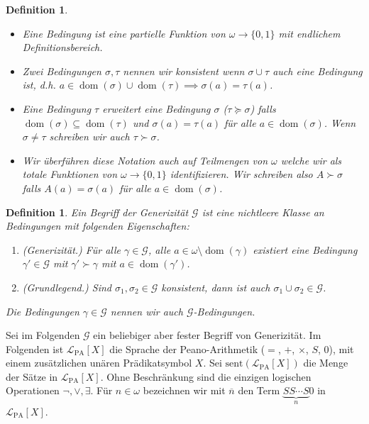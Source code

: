 \documentclass[nofonts]{uebung}
\newtheorem{definition}[theorem]{Definition}
\DeclareMathOperator{\dom}{dom}
\begin{document}
\begin{definition}\begin{itemize}
    \item Eine \emph{Bedingung} ist eine partielle Funktion von $\omega \to \{0,1\}$ mit endlichem Definitionsbereich.
        \item Zwei Bedingungen $\sigma,\tau$ nennen wir \emph{konsistent} wenn $\sigma\cup\tau$ auch eine Bedingung ist, d.h. $a\in\dom(\sigma)\cup\dom(\tau)\implies \sigma(a)=\tau(a)$.
    \item Eine Bedingung $\tau$ \emph{erweitert} eine Bedingung $\sigma$ ($\tau\succeq \sigma$) falls $\dom(\sigma)\subseteq\dom(\tau)$ und $\sigma(a)=\tau(a)$ für alle $a\in\dom(\sigma)$.
    Wenn $\sigma\neq\tau$ schreiben wir auch $\tau\succ\sigma$.
    \item Wir überführen diese Notation auch auf Teilmengen von $\omega$ welche wir als totale Funktionen von $\omega\to\{0,1\}$ identifizieren.
    Wir schreiben also $A\succ \sigma$ falls $A(a)=\sigma(a)$ für alle $a\in\dom(\sigma)$.
\end{itemize}
\end{definition}

\begin{definition}
    Ein \emph{Begriff der Generizität} $\mathcal G$ ist eine nichtleere Klasse an Bedingungen mit folgenden Eigenschaften:
    \begin{enumerate}
        \item (Generizität.) Für alle $\gamma\in\mathcal G$, alle $a\in \omega\setminus\dom(\gamma)$ existiert eine Bedingung $\gamma'\in\mathcal G$ mit $\gamma'\succ \gamma$ mit $a\in\dom(\gamma')$.
        \item (Grundlegend.) Sind $\sigma_1, \sigma_2\in\mathcal G$ konsistent, dann ist auch $\sigma_1\cup\sigma_2\in\mathcal G$.
    \end{enumerate}
    Die Bedingungen $\gamma\in \mathcal G$ nennen wir auch $\mathcal G$-\emph{Bedingungen}.
\end{definition}

Sei im Folgenden $\mathcal G$ ein beliebiger aber fester Begriff von Generizität.
Im Folgenden ist $\mathcal L_{\mathrm{PA}}[X]$ die Sprache der Peano-Arithmetik ($=$, $+$, $\times$, $S$, $0$), mit einem zusätzlichen unären Prädikatsymbol $X$.
Sei $\mathrm{sent}(\mathcal L_{\mathrm{PA}}[X])$ die Menge der Sätze in $\mathcal L_{\mathrm{PA}}[X]$.
Ohne Beschränkung sind die einzigen logischen Operationen $\neg, \lor, \exists$.
Für $n\in\omega$ bezeichnen wir mit $\overline{n}$ den Term $\underbrace{SS\cdots S}_{n}0$ in $\mathcal L_{\mathrm{PA}}[X]$.
\end{document}
